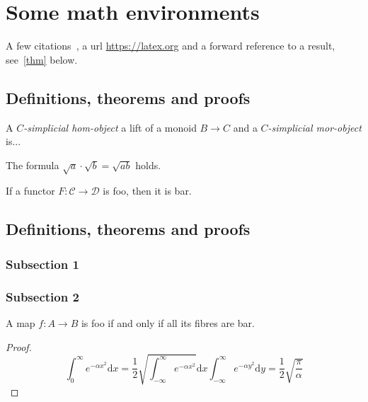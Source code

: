 \chapter{Some math environments}

\lipsum[5]

A few citations~\cite{SGA1,LaTeX}, a url \url{https://latex.org} and a forward
reference to a result, see~\cref{thm} below.

\section{Definitions, theorems and proofs}

\begin{definition}
  A \emph{\(C\)-simplicial hom-object} a lift of a monoid \(B \to C\) and a
  \emph{\(C\)-simplicial mor-object} is...
\end{definition}

\begin{lemma}
  The formula \(\sqrt a \cdot \sqrt b = \sqrt{ab}\) holds.
\end{lemma}

\begin{proposition}
  If a functor \(F : \mathcal C \to \mathcal D\) is foo, then it is bar.
\end{proposition}

\section{Definitions, theorems and proofs}

\lipsum[4]

\subsection{Subsection 1}

\lipsum[5]

\subsection{Subsection 2}

\lipsum[7]

\begin{theorem}\label{thm}
  A map \(f : A \to B\) is foo if and only if all its fibres are bar.
\end{theorem}
\begin{proof}
  \lipsum[7]
  \[
    \int_0^\infty e^{-\alpha x^2} \mathrm{d}x =
    \frac12\sqrt{\int_{-\infty}^\infty e^{-\alpha x^2}}
    \mathrm{d}x\int_{-\infty}^\infty e^{-\alpha y^2}\mathrm{d}y =
    \frac12\sqrt{\frac{\pi}{\alpha}}
  \]
  \lipsum[8]
\end{proof}

